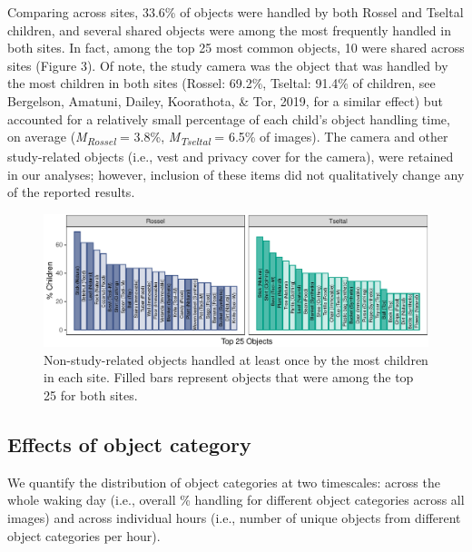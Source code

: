 \documentclass[10pt, letterpaper]{article}
\newenvironment{CodeChunk}{}{}
\begin{document}
Comparing across sites, 33.6\% of objects were handled by both Rossel
and Tseltal children, and several shared objects were among the most
frequently handled in both sites. In fact, among the top 25 most common
objects, 10 were shared across sites (Figure 3). Of note, the study
camera was the object that was handled by the most children in both
sites (Rossel: 69.2\%, Tseltal: 91.4\% of children, see Bergelson,
Amatuni, Dailey, Koorathota, \& Tor, 2019, for a similar effect) but
accounted for a relatively small percentage of each child's object
handling time, on average (\emph{M}\textsubscript{\emph{Rossel}} =
3.8\%, \emph{M}\textsubscript{\emph{Tseltal}} = 6.5\% of images). The
camera and other study-related objects (i.e., vest and privacy cover for
the camera), were retained in our analyses; however, inclusion of these
items did not qualitatively change any of the reported results.

\begin{CodeChunk}
\begin{figure}[!ht]

{\centering \includegraphics{figs/top-objects-fig-1} 

}

\caption[Non-study-related objects handled at least once by the most children in each site]{Non-study-related objects handled at least once by the most children in each site. Filled bars represent objects that were among the top 25 for both sites.}\label{fig:top-objects-fig}
\end{figure}
\end{CodeChunk}

\hypertarget{effects-of-object-category}{%
\subsection{Effects of object
category}\label{effects-of-object-category}}

We quantify the distribution of object categories at two timescales:
across the whole waking day (i.e., overall \% handling for different
object categories across all images) and across individual hours (i.e.,
number of unique objects from different object categories per hour).
\end{document}
